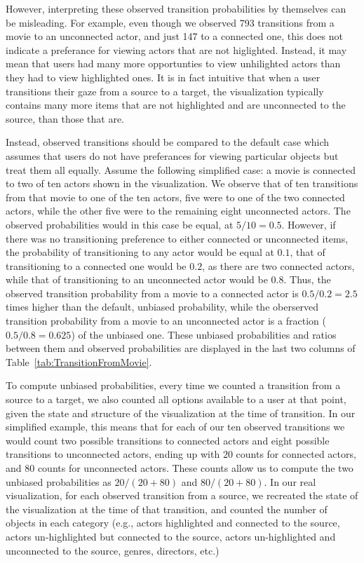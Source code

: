 However, interpreting these observed transition probabilities by themselves can be misleading. For example, even though we observed 793 transitions from a movie to an unconnected actor, and just 147 to a connected one, this does not indicate a preferance for viewing actors that are not higlighted.  Instead, it may mean that users had many more opportunties to view unhilighted actors than they had to view highlighted ones. It is in fact intuitive that when a user transitions their gaze from a source to a target, the visualization typically contains many more items that are not highlighted and are unconnected to the source, than those that are. 

Instead, observed transitions should be compared to the default case which assumes that users do not have preferances for viewing particular objects but treat them all equally. Assume the following simplified case: a movie is connected to two of ten actors shown in the visualization. We observe that of ten transitions from that movie to one of the ten actors, five were to one of the two connected actors, while the other five were to the remaining eight unconnected actors. The observed probabilities would in this case be equal, at $5/10 = 0.5$. However, if there was no transitioning preference to either connected or unconnected items, the probability of transitioning to any actor would be equal at $0.1$, that of  transitioning to a connected one would be $0.2$, as there are two connected actors, while that of transitioning to an unconnected actor would be $0.8$. Thus, the observed transition probability from a movie to a connected actor is $0.5/0.2=2.5$ times higher than the default, unbiased probability, while the oberserved transition probability from a movie to an unconnected actor is a fraction ($0.5/0.8=0.625$) of the unbiased one.  These unbiased probabilities and ratios between them and observed probabilities are displayed in the last two columns of Table~\ref{tab:TransitionFromMovie}. 

To compute unbiased probabilities, every time we counted a transition from a source to a target, we also counted all options available to a user at that point, given the state and structure of the visualization at the time of transition. In our simplified example, this means that for each of our ten observed transitions we would count two possible transitions to connected actors and eight possible transitions to unconnected actors, ending up with $20$ counts for connected actors, and $80$ counts for unconnected actors. These counts allow us to compute the two unbiased probabilities as $20/(20+80)$ and $80/(20+80)$. In our real visualization, for each observed transition from a source, we recreated the state of the visualization at the time of that transition, and counted the number of objects in each category (e.g., actors highlighted and connected to the source, actors un-highlighted but connected to the source, actors un-highlighted and unconnected to the source, genres, directors, etc.) 


